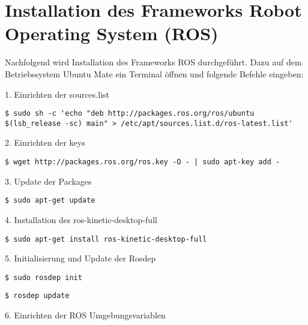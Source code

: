 \section{Installation des Frameworks Robot Operating System (ROS)}

Nachfolgend wird Installation des Frameworks ROS durchgeführt. Dazu auf dem Betriebssystem Ubuntu Mate ein Terminal öffnen und folgende Befehle eingeben:

1. Einrichten der sources.list\\

\begin{lstlisting}
$ sudo sh -c 'echo "deb http://packages.ros.org/ros/ubuntu $(lsb_release -sc) main" > /etc/apt/sources.list.d/ros-latest.list'
\end{lstlisting}
\vspace{-0.8cm}

2. Einrichten der keys\\

\begin{lstlisting}
$ wget http://packages.ros.org/ros.key -O - | sudo apt-key add -
\end{lstlisting}
\vspace{-0.8cm}

3. Update der Packages\\

\begin{lstlisting}
$ sudo apt-get update
\end{lstlisting}
\vspace{-0.8cm}

4. Installation des ros-kinetic-desktop-full\\

\begin{lstlisting}
$ sudo apt-get install ros-kinetic-desktop-full
\end{lstlisting}
\vspace{-0.8cm}

5. Initialisierung und Update der Rosdep\\

\begin{lstlisting}
$ sudo rosdep init
\end{lstlisting}

\begin{lstlisting}
$ rosdep update
\end{lstlisting}
\vspace{-0.8cm}

6. Einrichten der ROS Umgebungsvariablen\\

